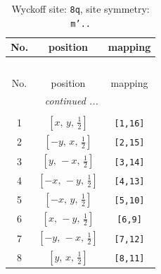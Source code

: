 \documentclass[fleqn,8pt]{jsarticle}
\begin{document}
\begin{longtable}{ccc}
\caption{Wyckoff site: {\tt 8q}, site symmetry: {\tt m'..}}
 \\
 \hline \hline
No. & position & mapping \\ \hline \endfirsthead

\multicolumn{2}{l}{\tablename\ \thetable{}} \\
 \hline \hline
No. & position & mapping \\ \hline \endhead

 \hline \hline
\multicolumn{2}{r}{\footnotesize\it continued ...} \\ \endfoot

 \hline \hline
\multicolumn{2}{r}{} \\ \endlastfoot

1 & $\left[ x,\, y,\, \frac{1}{2} \right]$ & {\tt [1,16]} \\ \hline
2 & $\left[ - y,\, x,\, \frac{1}{2} \right]$ & {\tt [2,15]} \\ \hline
3 & $\left[ y,\, - x,\, \frac{1}{2} \right]$ & {\tt [3,14]} \\ \hline
4 & $\left[ - x,\, - y,\, \frac{1}{2} \right]$ & {\tt [4,13]} \\ \hline
5 & $\left[ - x,\, y,\, \frac{1}{2} \right]$ & {\tt [5,10]} \\ \hline
6 & $\left[ x,\, - y,\, \frac{1}{2} \right]$ & {\tt [6,9]} \\ \hline
7 & $\left[ - y,\, - x,\, \frac{1}{2} \right]$ & {\tt [7,12]} \\ \hline
8 & $\left[ y,\, x,\, \frac{1}{2} \right]$ & {\tt [8,11]} \\
\end{longtable}
\renewcommand{\arraystretch}{1.2}
\end{document}
